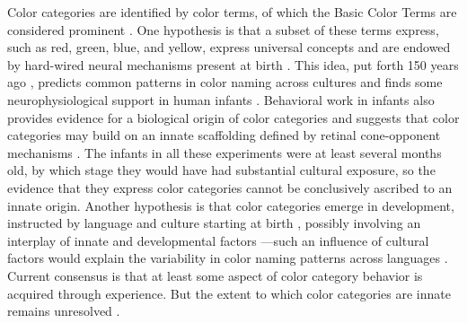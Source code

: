 Color categories are identified by color terms, of which the Basic Color Terms are considered prominent \citep{berlin_basic_1969}.
One hypothesis is that a subset of these terms express, such as red, green, blue, and yellow, express universal concepts \citep{heider_universals_1972,regier_focal_2005}
and are endowed by hard-wired neural mechanisms present at birth \citep{bornstein_categories_1976,lindsey_universality_2006}. 
This idea, put forth 150 years ago \citep{hering_zur_1875}, predicts common patterns in color naming across cultures \citep{baronchelli_modeling_2010,lindsey_hunter-gatherer_2015,abbott_focal_2016}
and finds some neurophysiological support in human infants \citep{clifford_electrophysiological_2009,yang_cortical_2016}. 
Behavioral work in infants also provides evidence for a biological origin of color categories \citep{franklin_new_2004,ozturk_language_2013} and suggests that color categories may build on an innate scaffolding defined by retinal cone-opponent mechanisms \citep{skelton_biological_2017}.
The infants in all these experiments were at least several months old, by which stage they would have had substantial cultural exposure, so the evidence that they express color categories cannot be conclusively ascribed to an innate origin. Another hypothesis is that color categories emerge in development, instructed by language and culture starting at birth \citep{davidoff_colour_1999,roberson_color_2005}, possibly involving an interplay of innate and developmental factors \citep{webster_variations_2002,kay_language_2006,franklin_lateralization_2008,regier_language_2009,paramei_online_2018}---such an influence of cultural factors would explain the variability in color naming patterns across languages \citep{davidoff_colour_1999,webster_variations_2002,roberson_color_2005,kay_language_2006,gibson_color_2017, paramei_online_2018}. Current consensus is that at least some aspect of color category behavior is acquired through experience. But the extent to which color categories are innate remains unresolved \citep{davidoff_nature_2009,RN18696,RN18699}.

